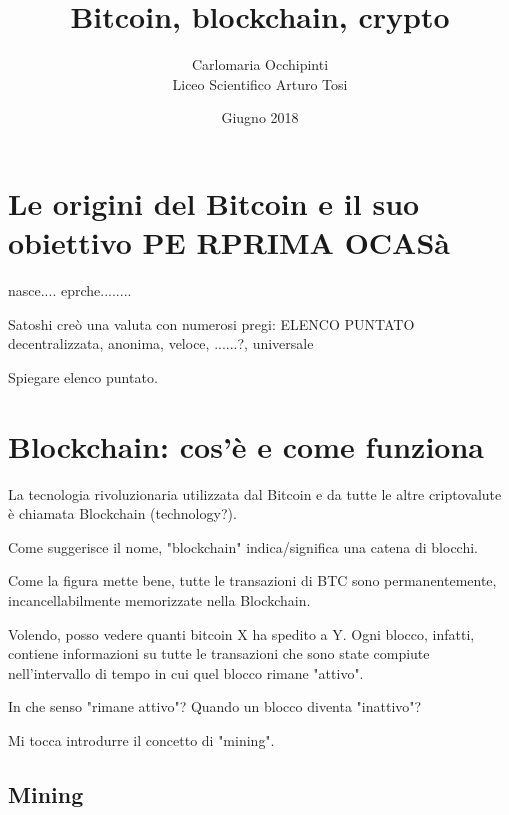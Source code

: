 \documentclass {article}
\title {{\Huge Bitcoin, blockchain, crypto}}
\author {Carlomaria Occhipinti\\Liceo Scientifico Arturo Tosi}
\date {Giugno 2018}
\begin{document}
\maketitle

\newpage

\tableofcontents


\newpage




\section {Le origini del Bitcoin e il suo obiettivo PE RPRIMA OCASà}



nasce.... eprche........

Satoshi creò una valuta con numerosi pregi: ELENCO PUNTATO decentralizzata, anonima, veloce, ......?, universale

Spiegare elenco puntato.



\section {Blockchain: cos'è e come funziona}



La tecnologia rivoluzionaria utilizzata dal Bitcoin e da tutte le altre criptovalute è chiamata Blockchain (technology?).

Come suggerisce il nome, "blockchain" indica/significa una catena di blocchi.

Come la figura mette bene, tutte le transazioni di BTC sono permanentemente, incancellabilmente memorizzate nella Blockchain.

Volendo, posso vedere quanti bitcoin X ha spedito a Y. Ogni blocco, infatti, contiene informazioni su tutte le transazioni che sono state compiute nell'intervallo di tempo in cui quel blocco rimane "attivo".

In che senso "rimane attivo"? Quando un blocco diventa "inattivo"?

Mi tocca introdurre il concetto di "mining".



\subsection {Mining}
\end{document}
